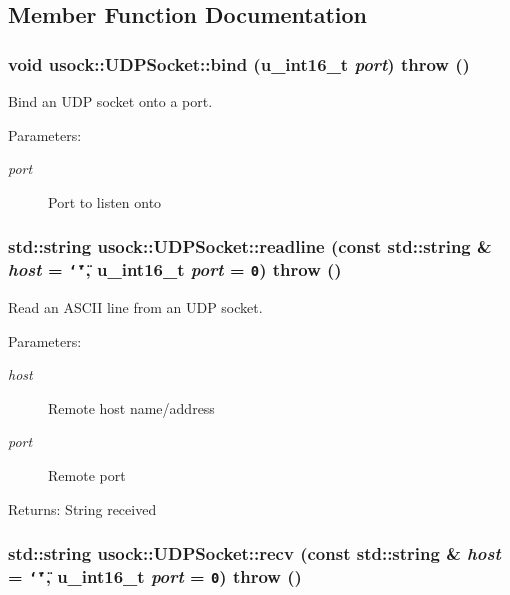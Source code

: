 \subsection{Member Function Documentation}
\hypertarget{classusock_1_1UDPSocket_daab178fe0b22f862e8d25d268080f05}{
\subsubsection[{bind}]{\setlength{\rightskip}{0pt plus 5cm}void usock::UDPSocket::bind (u\_\-int16\_\-t {\em port})  throw ()}}
\label{classusock_1_1UDPSocket_daab178fe0b22f862e8d25d268080f05}


Bind an UDP socket onto a port. 

\begin{Desc}
\item[Parameters:]
\begin{description}
\item[{\em port}]Port to listen onto \end{description}
\end{Desc}
\hypertarget{classusock_1_1UDPSocket_aead0f8a12cc8e98a98473bea4d15a0e}{
\subsubsection[{readline}]{\setlength{\rightskip}{0pt plus 5cm}std::string usock::UDPSocket::readline (const std::string \& {\em host} = {\tt \char`\"{}\char`\"{}}, \/  u\_\-int16\_\-t {\em port} = {\tt 0})  throw ()}}
\label{classusock_1_1UDPSocket_aead0f8a12cc8e98a98473bea4d15a0e}


Read an ASCII line from an UDP socket. 

\begin{Desc}
\item[Parameters:]
\begin{description}
\item[{\em host}]Remote host name/address \item[{\em port}]Remote port \end{description}
\end{Desc}
\begin{Desc}
\item[Returns:]String received \end{Desc}
\hypertarget{classusock_1_1UDPSocket_d6dec5293e2768a42b833fb42a720d22}{
\subsubsection[{recv}]{\setlength{\rightskip}{0pt plus 5cm}std::string usock::UDPSocket::recv (const std::string \& {\em host} = {\tt \char`\"{}\char`\"{}}, \/  u\_\-int16\_\-t {\em port} = {\tt 0})  throw ()}}
\label{classusock_1_1UDPSocket_d6dec5293e2768a42b833fb42a720d22}


